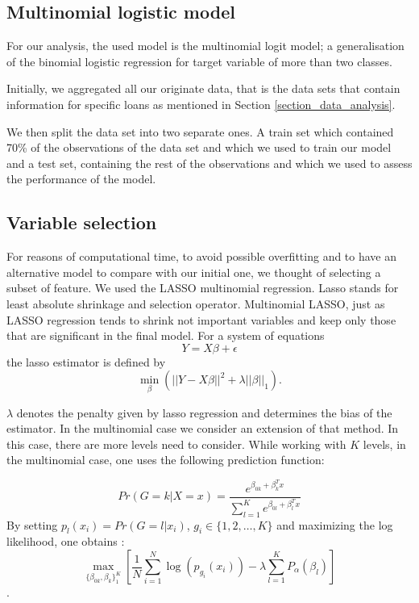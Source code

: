 \subsection{Multinomial logistic model}

For our analysis, the used model is the multinomial logit model; a generalisation of the binomial logistic regression for target variable of more than two classes.


Initially, we aggregated all our originate data, that is the data sets that contain information for specific loans as mentioned in Section \ref{section_data_analysis}.

We then split the data set into two separate ones. A train set which contained 70\% of the observations of the data set and which we used to train our model and a test set, containing the rest of the observations and which we used to assess the performance of the model.



\subsection{Variable selection}
For reasons of computational time, to avoid possible overfitting and to have an alternative model to compare with our initial one, we thought of selecting a subset of feature. We used the LASSO multinomial regression. Lasso stands for least absolute shrinkage and selection operator. Multinomial LASSO, just as LASSO regression tends to shrink not important variables and keep only those that are significant in the final model. For a system of equations $$Y=X\beta +\epsilon$$ the lasso estimator is defined by 
$$\min_\beta(||Y-X\beta||^2+\lambda||\beta||_1).$$

$\lambda$ denotes the penalty given by lasso regression and determines the bias of the estimator. 
In the multinomial case we consider an extension of that method. In this case, there are more levels need to consider. While working with $K$ levels, in the multinomial case, one uses the following prediction function:

$$Pr(G=k|X=x)=\frac{e^{\beta_{0k}+\beta_k^T x}} {\sum_{l=1}^K e^{\beta_{0l}+\beta_l^T x}}$$
By setting $p_l(x_i)=Pr(G=l|x_i)$, $g_i\in \{1,2, \hdots, K\}$ and maximizing the log likelihood, one obtains \parencite{Friedman_2010}: 
$$\max_{\{\beta_{0k},\beta_k\}_1^K}\left[\frac{1}{N}\sum_{i=1}^N \log(p_{g_i}(x_i))-\lambda \sum_{l=1}^K P_\alpha (\beta_l) \right]$$. 

